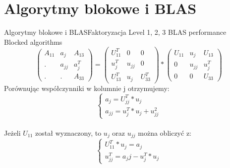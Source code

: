 \section{Algorytmy blokowe i BLAS}
	\begin{frame}{Algorytmy blokowe i BLAS}{Faktoryzacja}
		Level 1, 2, 3 BLAS performance \\
		Blocked algorithms \\
		$$
		\begin{pmatrix}
		A_{11} & a_j & A_{13} \\
		. & a_{jj} & a_j^T \\
		. & . & A_{33}
		\end{pmatrix}
		=
		\begin{pmatrix}
		U_{11}^T & 0 & 0 \\
		u_j^T & u_{jj} & 0 \\
		U_{13}^T & u_j & U_{33}^T
		\end{pmatrix}
		*
		\begin{pmatrix}
		U_{11} & u_j  & U_{13} \\
		0 & u_{jj} & u_j^T \\
		0 & 0 & U_{33}
		\end{pmatrix}
		$$
		Porównując współczynniki w kolumnie j otrzymujemy:
		$$
		\begin{cases}
		a_j = U_{jj}^T * u_j \\
		a_{jj} = u_j^T * u_j + u_{jj}^2
		\end{cases}
		$$ \\
		Jeżeli $U_{11}$ został wyznaczony, to $u_j$ oraz $u_{jj}$ można obliczyć z:
		$$
		\begin{cases}
		U_{11}^T * u_j = a_j \\
		u_{jj}^T = a_jj - u_j^T * u_{j}
		\end{cases}
		$$
	\end{frame}
